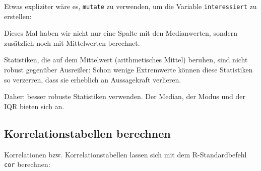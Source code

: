 \documentclass[12pt,ngerman,]{book}
\makeatletter
\newenvironment{Shaded}{\begin{snugshade}}{\end{snugshade}}
\newcommand{\KeywordTok}[1]{\textcolor[rgb]{0.13,0.29,0.53}{\textbf{#1}}}
\newcommand{\DataTypeTok}[1]{\textcolor[rgb]{0.13,0.29,0.53}{#1}}
\newcommand{\DecValTok}[1]{\textcolor[rgb]{0.00,0.00,0.81}{#1}}
\newcommand{\StringTok}[1]{\textcolor[rgb]{0.31,0.60,0.02}{#1}}
\newcommand{\CommentTok}[1]{\textcolor[rgb]{0.56,0.35,0.01}{\textit{#1}}}
\newcommand{\OperatorTok}[1]{\textcolor[rgb]{0.81,0.36,0.00}{\textbf{#1}}}
\newcommand{\NormalTok}[1]{#1}
\newenvironment{kframe}{%
\medskip{}
\setlength{\fboxsep}{.8em}
 \def\at@end@of@kframe{}%
 \ifinner\ifhmode%
  \def\at@end@of@kframe{\end{minipage}}%
  \begin{minipage}{\columnwidth}%
 \fi\fi%
 \def\FrameCommand##1{\hskip\@totalleftmargin \hskip-\fboxsep
 \colorbox{shadecolor}{##1}\hskip-\fboxsep
     \hskip-\linewidth \hskip-\@totalleftmargin \hskip\columnwidth}%
 \MakeFramed {\advance\hsize-\width
   \@totalleftmargin\z@ \linewidth\hsize
   \@setminipage}}%
 {\par\unskip\endMakeFramed%
 \at@end@of@kframe}
\renewenvironment{Shaded}{\begin{kframe}}{\end{kframe}}
\theoremstyle{definition}
\theoremstyle{definition}
\theoremstyle{remark}
\let\BeginKnitrBlock\begin \let\EndKnitrBlock\end
\makeatother
\begin{document}
Etwas expliziter wäre es, \texttt{mutate} zu verwenden, um die Variable
\texttt{interessiert} zu erstellen:

\begin{Shaded}
\end{Shaded}

Dieses Mal haben wir nicht nur eine Spalte mit den Medianwerten, sondern
zusätzlich noch mit Mittelwerten berechnet.

\BeginKnitrBlock{rmdcaution}
Statistiken, die auf dem Mittelwert (arithmetisches Mittel) beruhen,
sind nicht robust gegenüber Ausreißer: Schon wenige Extremwerte können
diese Statistiken so verzerren, dass sie erheblich an Aussagekraft
verlieren.

Daher: besser robuste Statistiken verwenden. Der Median, der Modus und
der IQR bieten sich an.
\EndKnitrBlock{rmdcaution}

\subsection{Korrelationstabellen
berechnen}\label{korrelationstabellen-berechnen}

Korrelationen bzw. Korrelationstabellen lassen sich mit dem
R-Standardbefehl \texttt{cor} berechnen:

\begin{Shaded}
\end{Shaded}
\end{document}

